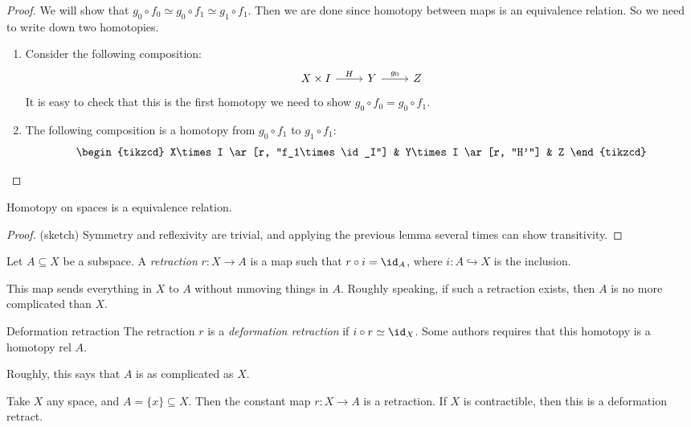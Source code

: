 \documentclass[a4paper]{article}
\begin{document}
\begin{proof}
  We will show that $g_0 \circ f_0 \simeq g_0 \circ f_1 \simeq g_1 \circ f_1$. Then we are done since homotopy between maps is an equivalence relation. So we need to write down two homotopies.

  \begin{enumerate}
    \item Consider the following composition:
      \[
        \begin{tikzcd}
          X\times I \ar[r, "H"] & Y \ar[r, "g_0"] & Z
        \end{tikzcd}
      \]
      It is easy to check that this is the first homotopy we need to show $g_0\circ f_0 = g_0 \circ f_1$.
    \item The following composition is a homotopy from $g_0 \circ f_1$ to $g_1 \circ f_1$:
      \[
        \begin{tikzcd}
          X\times I \ar[r, "f_1\times \id_I"] & Y\times I \ar[r, "H'"] & Z
        \end{tikzcd}
      \]
  \end{enumerate}
\end{proof}

\begin{prop}
  Homotopy on spaces is a equivalence relation.
\end{prop}

\begin{proof}(sketch)
  Symmetry and reflexivity are trivial, and applying the previous lemma several times can show transitivity.
\end{proof}

\begin{defi}[Retraction]
  Let $A\subseteq X$ be a subspace. A \emph{retraction} $r: X\to A$ is a map such that $r\circ i = \id_A$, where $i: A\hookrightarrow X$ is the inclusion.
\end{defi}
This map sends everything in $X$ to $A$ without mmoving things in $A$. Roughly speaking, if such a retraction exists, then $A$ is no more complicated than $X$.

\begin{defi}{Deformation retraction}
  The retraction $r$ is a \emph{deformation retraction} if $i\circ r \simeq \id_X$. Some authors requires that this homotopy is a homotopy rel $A$.
\end{defi}
Roughly, this says that $A$ is as complicated as $X$.

\begin{eg}
Take $X$ any space, and $A = \{x\}\subseteq X$. Then the constant map $r: X\to A$ is a retraction. If $X$ is contractible, then this is a deformation retract.
\end{eg}
\end{document}
